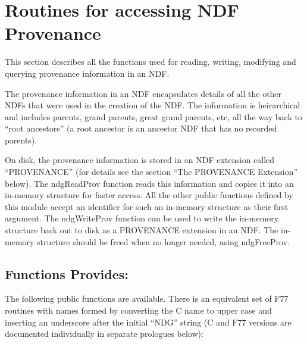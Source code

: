 \documentclass[twoside,11pt]{article}
\renewcommand{\_}{\texttt{\symbol{95}}}
\begin{document}
\newpage

\section{Routines for accessing NDF Provenance}

This section describes all the functions used for reading, writing,
modifying and querying provenance information in an NDF.

The provenance information in an NDF encapsulates details of all the
other NDFs that were used in the creation of the NDF. The information is
heirarchical and includes parents, grand parents, great grand parents,
etc, all the way back to ``root ancestors'' (a root ancestor is an ancestor
NDF that has no recorded parents).

On disk, the provenance information is stored in an NDF extension called
``PROVENANCE'' (for details see the section ``The PROVENANCE Extension''
below). The ndgReadProv function reads this information and copies it
into an in-memory structure for faster access. All the other public
functions defined by this module accept an identifier for such an
in-memory structure as their first argument. The ndgWriteProv function
can be used to write the in-memory structure back out to disk as a
PROVENANCE extension in an NDF. The in-memory structure should be freed
when no longer needed, using ndgFreeProv.

\subsection{Functions Provides:}
The following public functions are available. There is an equivalent set
of F77 routines with names formed by converting the C name to upper case
and inserting an underscore after the initial ``NDG'' string (C and F77
versions are documented individually in separate prologues below):
\end{document}
